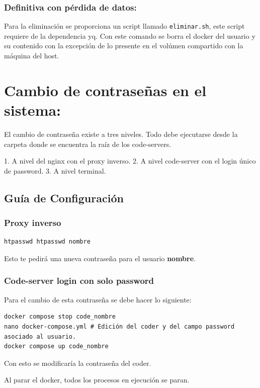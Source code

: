 \documentclass[12pt,a4paper]{report}
\begin{document}
\subsection{Definitiva con pérdida de datos:}
Para la eliminación se proporciona un script llamado \texttt{eliminar.sh}, este script requiere de la dependencia yq. Con este comando se borra el docker del usuario y su contenido con la excepción de lo presente en el volúmen compartido con la máquina del host. 

\chapter{Cambio de contraseñas en el sistema:}
El cambio de contraseña existe a tres niveles. Todo debe ejecutarse desde la carpeta donde se encuentra la raíz de los code-servers.

1. A nivel del nginx con el proxy inverso.
2. A nivel code-server con el login único de password. 
3. A nivel terminal. 

\section*{Guía de Configuración}

\subsection*{Proxy inverso}

\begin{lstlisting}
htpasswd htpasswd nombre
\end{lstlisting}

Esto te pedirá una nueva contraseña para el usuario \textbf{nombre}.

\subsection*{Code-server login con solo password}
Para el cambio de esta contraseña se debe hacer lo siguiente:


\begin{lstlisting}
docker compose stop code_nombre
nano docker-compose.yml # Edición del coder y del campo password asociado al usuario.
docker compose up code_nombre
\end{lstlisting}

Con esto se modificaría la contraseña del coder.

\begin{tcolorbox}[colback=red!5!white,colframe=red!75!black,title=\textbf{ADVERTENCIA}]
Al parar el docker, todos los procesos en ejecución se paran.
\end{tcolorbox}
\end{document}
